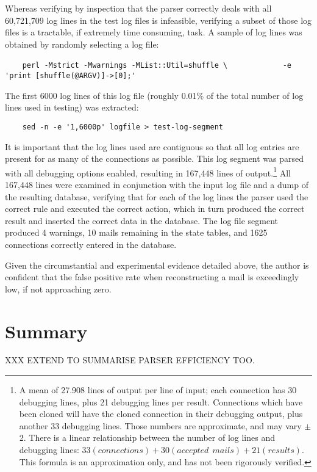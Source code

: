 Whereas verifying by inspection that the parser correctly deals with all
60,721,709 log lines in the test log files is infeasible, verifying a
subset of those log files is a tractable, if extremely time consuming,
task.  A sample of log lines was obtained by randomly selecting a log file:

\verb!    perl -Mstrict -Mwarnings -MList::Util=shuffle \!\newline{}
\verb!            -e 'print [shuffle(@ARGV)]->[0];'!

The first 6000 log lines of this log file (roughly 0.01\% of the total
number of log lines used in testing) was extracted:

\verb!    sed -n -e '1,6000p' logfile > test-log-segment!

It is important that the log lines used are contiguous so that all log
entries are present for as many of the connections as possible.  This log
segment was parsed with all debugging options enabled, resulting in 167,448
lines of output.\footnote{A mean of 27.908 lines of output per line of
input; each connection has 30 debugging lines, plus 21 debugging lines per
result.  Connections which have been cloned will have the cloned connection
in their debugging output, plus another 33 debugging lines.  Those numbers
are approximate, and may vary $\pm{}$ 2.  There is a linear relationship
between the number of log lines and debugging lines: $33(connections) +
30(accepted~~mails) + 21(results)$.  This formula is an approximation only,
and has not been rigorously verified.}  All 167,448 lines were examined in
conjunction with the input log file and a dump of the resulting database,
verifying that for each of the log lines the parser used the correct rule
and executed the correct action, which in turn produced the correct result
and inserted the correct data in the database.  The log file segment
produced 4 warnings, 10 mails remaining in the state tables, and 1625
connections correctly entered in the database.

Given the circumstantial and experimental evidence detailed above, the
author is confident that the false positive rate when reconstructing a mail
is exceedingly low, if not approaching zero.

\section{Summary}

XXX EXTEND TO SUMMARISE PARSER EFFICIENCY TOO\@.

